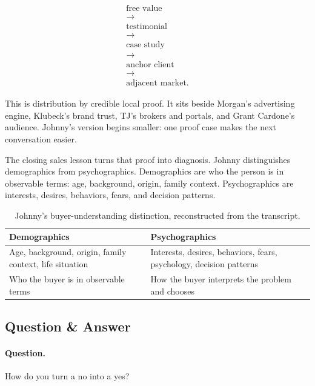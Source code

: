 \documentclass[11pt,oneside]{book}
\begin{document}
\begin{equation}
\begin{gathered}
\text{free value}\\
\rightarrow\\
\text{testimonial}\\
\rightarrow\\
\text{case study}\\
\rightarrow\\
\text{anchor client}\\
\rightarrow\\
\text{adjacent market}.
\end{gathered}
\end{equation}

This is distribution by credible local proof. It sits beside Morgan's advertising engine, Klubeck's brand trust, TJ's brokers and portals, and Grant Cardone's audience. Johnny's version begins smaller: one proof case makes the next conversation easier.

The closing sales lesson turns that proof into diagnosis. Johnny distinguishes demographics from psychographics. Demographics are who the person is in observable terms: age, background, origin, family context. Psychographics are interests, desires, behaviors, fears, and decision patterns.

\begin{table}
\centering
\begin{tabular}{|p{.40\linewidth}|p{.46\linewidth}|}
\hline
\textbf{Demographics} & \textbf{Psychographics}\\
\hline
Age, background, origin, family context, life situation & Interests, desires, behaviors, fears, psychology, decision patterns\\
\hline
Who the buyer is in observable terms & How the buyer interprets the problem and chooses\\
\hline
\end{tabular}
\caption{Johnny's buyer-understanding distinction, reconstructed from the transcript.}
\end{table}

\subsection{Question \& Answer}

\paragraph{Question.}
How do you turn a no into a yes?
\end{document}
